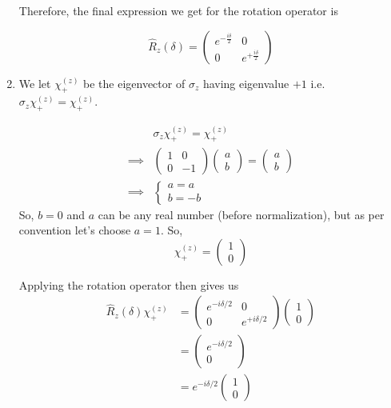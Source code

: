 \documentclass{article}
\begin{document}
\begin{enumerate}[label=(\alph*)]
  Therefore, the final expression we get for the rotation operator is

  \[ \boxed{\hat{R}_z(\delta) = \begin{pmatrix}
    e^{-\frac{i \delta}{2}} & 0 \\
    0 &  e^{+\frac{i \delta}{2}}
  \end{pmatrix}} \]

  \vskip 0.5cm
  \item We let $\chi_+^{(z)}$ be the eigenvector of $\sigma_z$ having eigenvalue $+1$ i.e. $\sigma_z \chi_+^{(z)} = \chi_+^{(z)}$.
  
  \begin{align*}
    &\sigma_z \chi_+^{(z)} = \chi_+^{(z)} \\
    \implies &\begin{pmatrix}
      1 & 0 \\
      0 & -1
    \end{pmatrix} \begin{pmatrix}
      a \\
      b
    \end{pmatrix} = \begin{pmatrix}
      a \\
      b
    \end{pmatrix} \\
    \implies &\begin{cases}
      a = a \\
      b = -b
    \end{cases}
  \end{align*}
  So, $b = 0$ and $a$ can be any real number (before normalization), but as per convention let's choose $a = 1$. So,
  \[ \boxed{ \chi_+^{(z)} = \begin{pmatrix} 1 \\ 0 \end{pmatrix} } \]

  Applying the rotation operator then gives us 
  \begin{align*}
    \hat{R}_z(\delta) \chi_+^{(z)} &= \begin{pmatrix}
      e^{-i \delta / 2} & 0 \\
      0 & e^{+i \delta / 2}  
    \end{pmatrix} \begin{pmatrix}
      1 \\ 0
    \end{pmatrix} \\
    &= \begin{pmatrix}
      e^{-i \delta / 2} \\ 0
    \end{pmatrix} \\
    &= e^{- i \delta /2 } \begin{pmatrix}
      1 \\ 0
    \end{pmatrix}
  \end{align*}


\end{enumerate}
\end{document}
